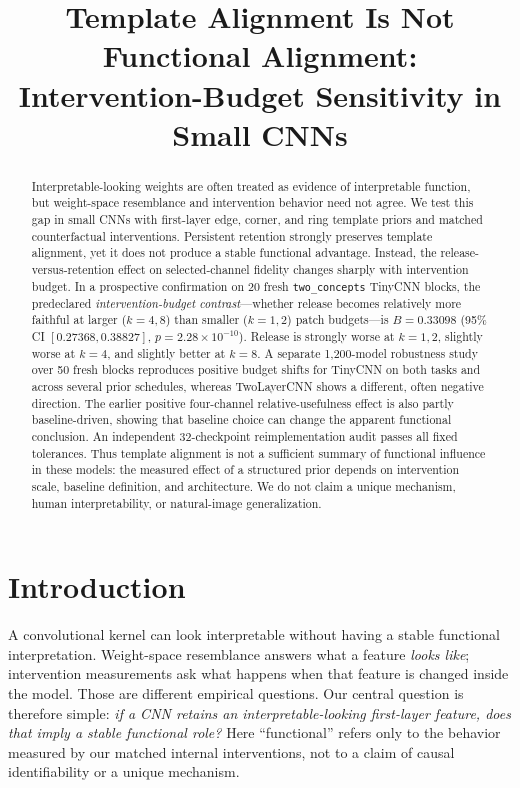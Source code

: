 \documentclass[10pt]{article}
\title{Template Alignment Is Not Functional Alignment: Intervention-Budget Sensitivity in Small CNNs}
\author{}
\date{}
\begin{document}
\maketitle

\begin{abstract}
Interpretable-looking weights are often treated as evidence of interpretable function, but weight-space resemblance and intervention behavior need not agree. We test this gap in small CNNs with first-layer edge, corner, and ring template priors and matched counterfactual interventions. Persistent retention strongly preserves template alignment, yet it does not produce a stable functional advantage. Instead, the release-versus-retention effect on selected-channel fidelity changes sharply with intervention budget. In a prospective confirmation on 20 fresh \texttt{two\_concepts} TinyCNN blocks, the predeclared \emph{intervention-budget contrast}---whether release becomes relatively more faithful at larger ($k=4,8$) than smaller ($k=1,2$) patch budgets---is $B=0.33098$ (95\% CI $[0.27368,0.38827]$, $p=2.28\times10^{-10}$). Release is strongly worse at $k=1,2$, slightly worse at $k=4$, and slightly better at $k=8$. A separate 1,200-model robustness study over 50 fresh blocks reproduces positive budget shifts for TinyCNN on both tasks and across several prior schedules, whereas TwoLayerCNN shows a different, often negative direction. The earlier positive four-channel relative-usefulness effect is also partly baseline-driven, showing that baseline choice can change the apparent functional conclusion. An independent 32-checkpoint reimplementation audit passes all fixed tolerances. Thus template alignment is not a sufficient summary of functional influence in these models: the measured effect of a structured prior depends on intervention scale, baseline definition, and architecture. We do not claim a unique mechanism, human interpretability, or natural-image generalization.
\end{abstract}

\section{Introduction}\label{sec:introduction}

A convolutional kernel can look interpretable without having a stable functional interpretation. Weight-space resemblance answers what a feature \emph{looks like}; intervention measurements ask what happens when that feature is changed inside the model. Those are different empirical questions. Our central question is therefore simple: \emph{if a CNN retains an interpretable-looking first-layer feature, does that imply a stable functional role?} Here ``functional'' refers only to the behavior measured by our matched internal interventions, not to a claim of causal identifiability or a unique mechanism.
\end{document}
